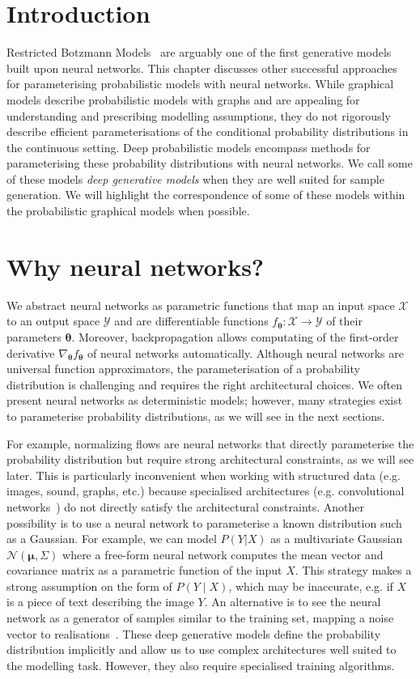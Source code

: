 \section{Introduction}
Restricted Botzmann Models~\citep{hinton2002training} are arguably one of the first generative models built upon neural networks. This chapter discusses other successful approaches for parameterising probabilistic models with neural networks. While graphical models describe probabilistic models with graphs and are appealing for understanding and prescribing modelling assumptions, they do not rigorously describe efficient parameterisations of the conditional probability distributions in the continuous setting. Deep probabilistic models encompass methods for parameterising these probability distributions with neural networks. We call some of these models \textit{deep generative models} when they are well suited for sample generation. We will highlight the correspondence of some of these models within the probabilistic graphical models when possible.

\section{Why neural networks?}
We abstract neural networks as parametric functions that map an input space $\mathcal{X}$ to an output space $\mathcal{Y}$ and are differentiable functions $f_{\bm{\theta}}: \mathcal{X} \rightarrow \mathcal{Y}$ of their parameters $\bm{\theta}$. Moreover, backpropagation allows computating of the first-order derivative $\nabla_{\bm{\theta}}f_{\bm{\theta}}$ of neural networks automatically. Although neural networks are universal function approximators, the parameterisation of a probability distribution is challenging and requires the right architectural choices. We often present neural networks as deterministic models; however, many strategies exist to parameterise probability distributions, as we will see in the next sections.

For example, normalizing flows are neural networks that directly parameterise the probability distribution but require strong architectural constraints, as we will see later. This is particularly inconvenient when working with structured data (e.g. images, sound, graphs, etc.) because specialised architectures (e.g. convolutional networks~\citep{lecun1995convolutional}) do not directly satisfy the architectural constraints. Another possibility is to use a neural network to parameterise a known distribution such as a Gaussian. For example, we can model $P(Y|X)$ as a multivariate Gaussian $\mathcal{N}(\bm{\mu}, \Sigma)$ where a free-form neural network computes the mean vector and covariance matrix as a parametric function of the input $X$. This strategy makes a strong assumption on the form of $P(Y\mid X)$, which may be inaccurate, e.g. if $X$ is a piece of text describing the image $Y$. An alternative is to see the neural network as a generator of samples similar to the training set, mapping a noise vector to realisations~\citep{goodfellow2020generative}. These deep generative models define the probability distribution implicitly and allow us to use complex architectures well suited to the modelling task. However, they also require specialised training algorithms.

